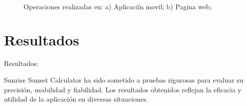\documentclass[conference]{IEEEtran}
\begin{document}
\begin{figure}
\\
\caption{Operaciones realizadas en: a) Aplicaciín movil; b) Pagina web;
}
\label{fig:nonlinearity}
\end{figure}


\section{Resultados}

Resultados:

Sunrise Sunset Calculator ha sido sometido a pruebas rigurosas para evaluar su precisión, usabilidad y fiabilidad. Los resultados obtenidos reflejan la eficacia y utilidad de la aplicación en diversas situaciones.
\end{document}
